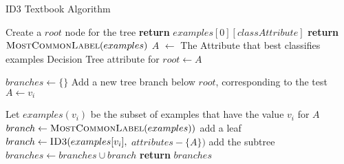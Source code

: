 \begin{algorithm}[H]
\caption{ID3 Textbook Algorithm }\label{a:id3-simple}
\begin{algorithmic}[1]
    \State Create a $root$ node for the tree
        \State \textbf{return} $examples[0][classAttribute]$
        \State \textbf{return} $\textsc{MostCommonLabel}(examples)$
    \EndIf
    \State $A$ $\gets$ The Attribute that best classifies examples
    \State Decision Tree attribute for $root \gets A$

    \State $branches \gets \{\}$
        \State Add a new tree branch below $root$, corresponding to the test $A \gets v_i$
        
        \State Let $examples(v_i)$ be the subset of examples that have the value $v_i$ for $A$
            \State $branch \gets \textsc{MostCommonLabel}(examples))$ add a leaf
        \Else
            \State $branch \gets \textsc{ID3}(examples[v_i],$ $attributes - \{A\})$ add the subtree
        \EndIf
        \State $branches \gets branches \cup branch$
    \EndFor
    \State \textbf{return} $branches$
\EndProcedure
\end{algorithmic}
\end{algorithm}

